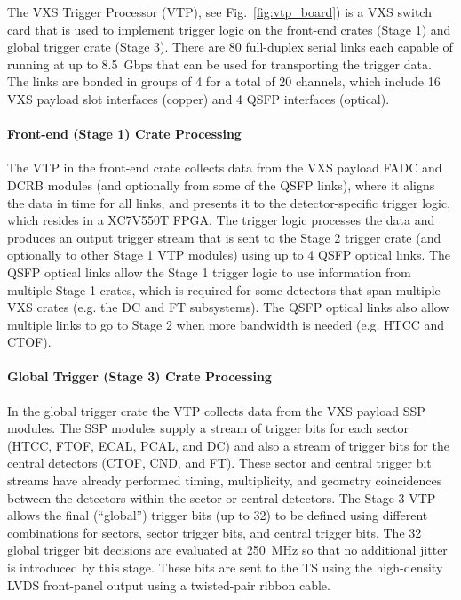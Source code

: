 The VXS Trigger Processor (VTP), see Fig.~\ref{fig:vtp_board}) is a VXS switch card that is used to implement trigger logic on the front-end crates (Stage 1) and global trigger crate (Stage 3). There are 80 full-duplex serial links each capable of running at up to 8.5~Gbps that can be used for transporting the trigger data. The links are bonded in groups of 4 for a total of 20 channels, which include 16 VXS payload slot interfaces (copper) and 4 QSFP interfaces (optical).

\paragraph{Front-end (Stage 1) Crate Processing}
The VTP in the front-end crate collects data from the VXS payload FADC and DCRB modules (and optionally from some of the QSFP links), where it aligns the data in time for all links, and presents it to the detector-specific trigger logic, which resides in a XC7V550T FPGA. The trigger logic processes the data and produces an output trigger stream that is sent to the Stage 2 trigger crate (and optionally to other Stage 1 VTP modules) using up to 4 QSFP optical links. The QSFP optical links allow the Stage 1 trigger logic to use information from multiple Stage 1 crates, which is required for some detectors that span multiple VXS crates (e.g. the DC and FT subsystems). The QSFP optical links also allow multiple links to go to Stage 2 when more bandwidth is needed (e.g. HTCC and CTOF).

\paragraph{Global Trigger (Stage 3) Crate Processing}
In the global trigger crate the VTP collects data from the VXS payload SSP modules. The SSP modules supply a stream of trigger bits for each sector (HTCC, FTOF, ECAL, PCAL, and DC) and also a stream of trigger bits for the central detectors (CTOF, CND, and FT). These sector and central trigger bit streams have already performed timing, multiplicity, and geometry coincidences between the detectors within the sector or central detectors. The Stage 3 VTP allows the final (``global'') trigger bits (up to 32) to be defined using different combinations for sectors, sector trigger bits, and central trigger bits. The 32 global trigger bit decisions are evaluated at 250~MHz so that no additional jitter is introduced by this stage. These bits are sent to the TS using the high-density LVDS front-panel output using a twisted-pair ribbon cable.

